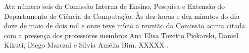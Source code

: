 \documentclass[11pt]{article}
\begin{document}
\header
{}

\begin{linenumbers}
\noindent

Ata número seis da Comissão Interna de Ensino, Pesquisa e Extensão do Departamento de Ciência da Computação. Às dez horas e dez minutos do dia doze de maio de dois mil e onze teve início a reunião da Comissão acima citada com a presença dos professores membros Ana Elisa Tozetto Piekarski, Daniel Kikuti, Diego Marczal e Sílvia Amélia Bim. XXXXX  .

\end{linenumbers}

\end{document}
